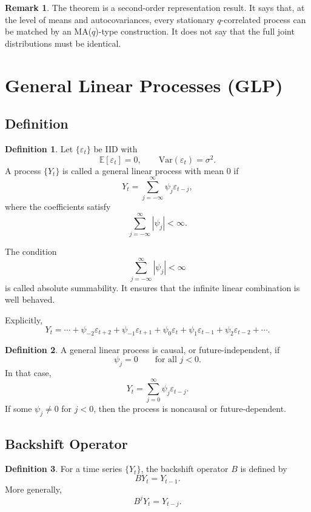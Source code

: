 \documentclass[12pt,oneside]{book}
\numberwithin{equation}{section}
\theoremstyle{definition}
\newtheorem{definition}{Definition}[section]
\newtheorem{remark}{Remark}[section]
\theoremstyle{plain}
\theoremstyle{remark}
\newcommand{\E}{\mathbb{E}}
\newcommand{\Var}{\mathrm{Var}}
\begin{document}
\begin{remark}
The theorem is a second-order representation result. It says that, at the level of means and autocovariances, every stationary $q$-correlated process can be matched by an MA($q$)-type construction. It does not say that the full joint distributions must be identical.
\end{remark}

\section{General Linear Processes (GLP)}

\subsection{Definition}

\begin{definition}
Let $\{\varepsilon_t\}$ be IID with
\[
\E[\varepsilon_t]=0,
\qquad
\Var(\varepsilon_t)=\sigma^2.
\]
A process $\{Y_t\}$ is called a general linear process with mean $0$ if
\[
Y_t
=
\sum_{j=-\infty}^{\infty}\psi_j\varepsilon_{t-j},
\]
where the coefficients satisfy
\[
\sum_{j=-\infty}^{\infty}|\psi_j|<\infty.
\]
\end{definition}

The condition
\[
\sum_{j=-\infty}^{\infty}|\psi_j|<\infty
\]
is called absolute summability. It ensures that the infinite linear combination is well behaved.

Explicitly,
\[
Y_t
=
\cdots
+
\psi_{-2}\varepsilon_{t+2}
+
\psi_{-1}\varepsilon_{t+1}
+
\psi_0\varepsilon_t
+
\psi_1\varepsilon_{t-1}
+
\psi_2\varepsilon_{t-2}
+
\cdots.
\]

\begin{definition}
A general linear process is causal, or future-independent, if
\[
\psi_j=0
\qquad
\text{for all } j<0.
\]
In that case,
\[
Y_t
=
\sum_{j=0}^{\infty}\psi_j\varepsilon_{t-j}.
\]
If some $\psi_j\neq 0$ for $j<0$, then the process is noncausal or future-dependent.
\end{definition}

\subsection{Backshift Operator}

\begin{definition}
For a time series $\{Y_t\}$, the backshift operator $B$ is defined by
\[
BY_t=Y_{t-1}.
\]
More generally,
\[
B^jY_t=Y_{t-j}.
\]
\end{definition}
\end{document}
